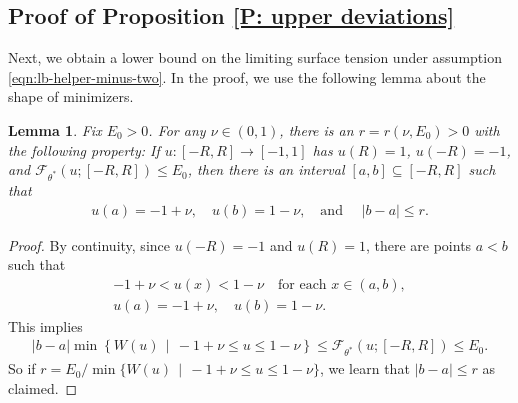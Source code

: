 \documentclass[10pt,a4paper]{amsart}
\newtheorem{lemma}{Lemma}
\begin{document}
\subsection{Proof of Proposition \ref{P: upper deviations}} Next, we obtain a lower bound on the limiting surface tension under assumption \eqref{eqn:lb-helper-minus-two}. In the proof, we use the following lemma about the shape of minimizers.
	
	\begin{lemma} \label{L: topology lemma} Fix $ E_{0} > 0$. For any $\nu \in (0,1)$, there is an $ r = r (\nu, E_{0}) > 0$ with the following property: If $u : [-R,R] \to [-1,1]$ has $u(R) = 1$, $u(-R) = -1$, and $\mathscr{F}_{\theta^{*}}(u; [-R,R]) \leq E_{0}$, then there is an interval $[a,b] \subseteq [ -R, R ]$ such that 
		\begin{align*}
			u(a) = -1 + \nu, \quad u(b) = 1 - \nu, \quad \text{and} \, \, \quad |b - a| \leq r.
		\end{align*}
	\end{lemma} 
	
		\begin{proof} By continuity, since $u(-R) = -1$ and $u(R) = 1$, there are points $a < b$ such that 
			\begin{gather*}
				-1 + \nu < u(x) < 1 - \nu \quad \text{for each} \, \, x \in (a,b), \\
				u(a) = -1 + \nu, \quad u(b) = 1 - \nu.
			\end{gather*}
		This implies
			\begin{align*}
				|b - a| \min \left\{ W(u) \, \mid \, -1 + \nu \leq u \leq 1 - \nu \right\} \leq \mathscr{F}_{\theta^{*}}(u;[-R,R]) \leq E_{0}.
			\end{align*}
		So if $ r =  E_{0}  / \min \{ W(u) \, \mid \, -1 + \nu \leq u \leq 1 - \nu \} $, we learn that $ |b - a| \leq r $ as claimed.
	\end{proof}
		
\end{document}
